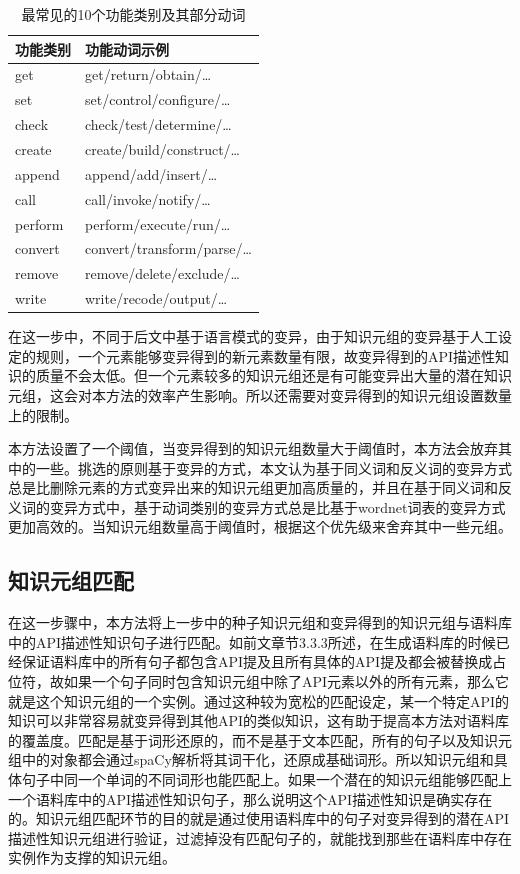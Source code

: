 \begin{table}[h]
    \centering
    \caption{最常见的10个功能类别及其部分动词}
    \label{表3-2}
    \begin{tabular}{|l|l|}
        \hline
        功能类别    & 功能动词示例                    \\ \hline
        get     & get/return/obtain/…       \\ \hline
        set     & set/control/configure/…   \\ \hline
        check   & check/test/determine/…    \\ \hline
        create  & create/build/construct/…  \\ \hline
        append  & append/add/insert/…       \\ \hline
        call    & call/invoke/notify/…      \\ \hline
        perform & perform/execute/run/…     \\ \hline
        convert & convert/transform/parse/… \\ \hline
        remove  & remove/delete/exclude/…   \\ \hline
        write   & write/recode/output/…     \\ \hline
    \end{tabular}
\end{table}

在这一步中，不同于后文中基于语言模式的变异，由于知识元组的变异基于人工设定的规则，一个元素能够变异得到的新元素数量有限，故变异得到的API描述性知识的质量不会太低。但一个元素较多的知识元组还是有可能变异出大量的潜在知识元组，这会对本方法的效率产生影响。所以还需要对变异得到的知识元组设置数量上的限制。

本方法设置了一个阈值，当变异得到的知识元组数量大于阈值时，本方法会放弃其中的一些。挑选的原则基于变异的方式，本文认为基于同义词和反义词的变异方式总是比删除元素的方式变异出来的知识元组更加高质量的，并且在基于同义词和反义词的变异方式中，基于动词类别的变异方式总是比基于wordnet词表的变异方式更加高效的。当知识元组数量高于阈值时，根据这个优先级来舍弃其中一些元组。

\subsection{知识元组匹配}
在这一步骤中，本方法将上一步中的种子知识元组和变异得到的知识元组与语料库中的API描述性知识句子进行匹配。如前文章节3.3.3所述，在生成语料库的时候已经保证语料库中的所有句子都包含API提及且所有具体的API提及都会被替换成占位符，故如果一个句子同时包含知识元组中除了API元素以外的所有元素，那么它就是这个知识元组的一个实例。通过这种较为宽松的匹配设定，某一个特定API的知识可以非常容易就变异得到其他API的类似知识，这有助于提高本方法对语料库的覆盖度。匹配是基于词形还原的，而不是基于文本匹配，所有的句子以及知识元组中的对象都会通过spaCy解析将其词干化，还原成基础词形。所以知识元组和具体句子中同一个单词的不同词形也能匹配上。如果一个潜在的知识元组能够匹配上一个语料库中的API描述性知识句子，那么说明这个API描述性知识是确实存在的。知识元组匹配环节的目的就是通过使用语料库中的句子对变异得到的潜在API描述性知识元组进行验证，过滤掉没有匹配句子的，就能找到那些在语料库中存在实例作为支撑的知识元组。


